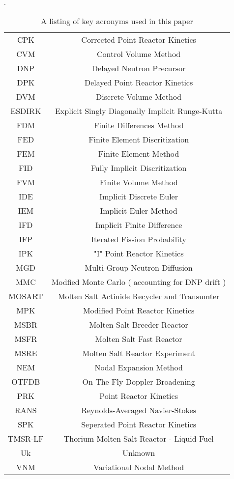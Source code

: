 \documentclass[review]{elsarticle}
\begin{document}
\begin{table}[h]
    \caption{A listing of key acronyms used in this paper}.
    \label{tbl:nomen}
    \begin{center}
        \begin{tabular}{|c c|}
            \hline
            CPK & Corrected Point Reactor Kinetics \\
            CVM & Control Volume Method \\
            DNP & Delayed Neutron Precursor \\
            DPK & Delayed Point Reactor Kinetics \\
            DVM & Discrete Volume Method \\
            ESDIRK & Explicit Singly Diagonally Implicit Runge-Kutta \\
            FDM & Finite Differences Method \\
            FED & Finite Element Discritization \\
            FEM & Finite Element Method \\
            FID & Fully Implicit Discritization \\
            FVM & Finite Volume Method \\
            IDE & Implicit Discrete Euler \\
            IEM & Implicit Euler Method \\
            IFD & Implicit Finite Difference \\
            IFP & Iterated Fission Probability \\
            IPK & "I" Point Reactor Kinetics \\
            MGD & Multi-Group Neutron Diffusion \\
            MMC & Modfied Monte Carlo ( accounting for DNP drift ) \\
            MOSART & Molten Salt Actinide Recycler and Transumter \\
            MPK & Modified Point Reactor Kinetics \\
            MSBR & Molten Salt Breeder Reactor \\
            MSFR & Molten Salt Fast Reactor \\
            MSRE & Molten Salt Reactor Experiment \\
            NEM & Nodal Expansion Method \\
            OTFDB & On The Fly Doppler Broadening \\
            PRK & Point Reactor Kinetics \\
            RANS & Reynolds-Averaged Navier-Stokes \\
            SPK & Seperated Point Reactor Kinetics \\
            TMSR-LF & Thorium Molten Salt Reactor - Liquid Fuel \\
            Uk & Unknown \\
            VNM & Variational Nodal Method \\
            \hline
        \end{tabular}
    \end{center}
\end{table}
\end{document}
